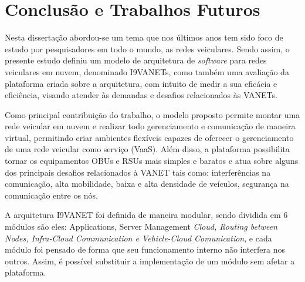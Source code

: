 \documentclass[
	12pt,				%
	oneside,			%
	a4paper,			%
	english,			%
	brazil				%
	]{abntex2ppgsi}
\begin{document}


\chapter{Conclusão e Trabalhos Futuros}\label{sec:conclusao}

Nesta dissertação abordou-se um tema que nos últimos anos tem sido foco de estudo por pesquisadores em todo o mundo, as redes veiculares. Sendo assim, o presente estudo definiu um modelo de  arquitetura de \textit{software} para redes veiculares em nuvem, denominado I9VANETs, como também uma avaliação da plataforma criada sobre a arquitetura, com intuito de medir a sua eficácia e eficiência, visando atender às demandas e desafios relacionados às VANETs. 


Como principal contribuição do trabalho, o modelo proposto permite montar uma rede veicular em nuvem e realizar todo gerenciamento e comunicação de maneira virtual, permitindo criar ambientes flexíveis capazes de oferecer o gerenciamento de uma rede veicular como serviço (VaaS). Além disso, a plataforma possibilita tornar os equipamentos OBUs e RSUs mais simples e baratos e atua sobre alguns dos principais desafios relacionados à VANET tais como: interferências na comunicação, alta mobilidade, baixa e alta densidade de veículos, segurança na comunicação entre os nós. 


A arquitetura I9VANET foi definida de maneira modular, sendo dividida em 6 módulos são eles: Applications, Server Management \textit{Cloud, Routing between Nodes, Infra-Cloud Communication e Vehicle-Cloud Comunication}, e cada módulo foi pensado de forma que seu funcionamento interno não interfera nos outros. Assim, é possível substituir a implementação de um módulo sem afetar a plataforma.
\end{document}
